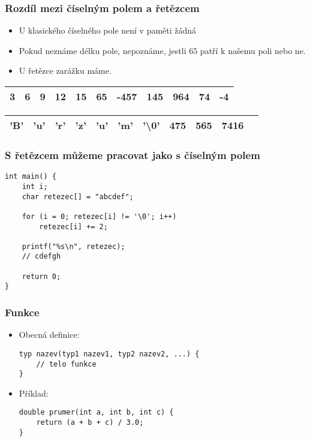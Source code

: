 \documentclass{beamer}
\newenvironment{itemizex}%
  {\large \begin{itemize}%
    \setlength{\itemsep}{8pt}%
    \setlength{\parskip}{8pt}}%
  {\end{itemize}}
\begin{document}
\begin{frame}[t,fragile]\frametitle{Rozdíl mezi číselným polem a řetězcem} 
\begin{itemizex}
    \item U klasického číselného pole není v paměti žádná 
    \item Pokud neznáme délku pole, nepoznáme, jestli $65$ patří k našemu poli nebo ne.
    \item U řetězce zarážku máme.
\end{itemizex}
\begin{center}
\begin{tabular}{|c|c|c|c|c|c|c|c|c|c|c|}
\hline 3& 6& 9& 12& 15 &65&-457&145&964&74&-4 \\\hline
\end{tabular}
\vskip 5mm
\begin{tabular}{|c|c|c|c|c|c|c|c|c|c|c|}
\hline 'B'&'u'&'r'&'z'&'u'&'m'&'\textbackslash0'&475&565&7416 \\\hline
\end{tabular}
\end{center}
\end{frame}


\begin{frame}[t,fragile]\frametitle{S řetězcem můžeme pracovat jako s číselným polem} 
\begin{verbatim} 
int main() {
    int i;
    char retezec[] = "abcdef";

    for (i = 0; retezec[i] != '\0'; i++)
        retezec[i] += 2;

    printf("%s\n", retezec);
    // cdefgh

    return 0;     
}
\end{verbatim}
\end{frame}


\begin{frame}[t,fragile]\frametitle{Funkce} 
\begin{itemizex}
    \item Obecná definice:
    \begin{verbatim} 
typ nazev(typ1 nazev1, typ2 nazev2, ...) {
    // telo funkce
}
    \end{verbatim}
    \item Příklad:
    \begin{verbatim} 
double prumer(int a, int b, int c) {
    return (a + b + c) / 3.0;
}
    \end{verbatim}
\end{itemizex}
\end{frame}
\end{document}

